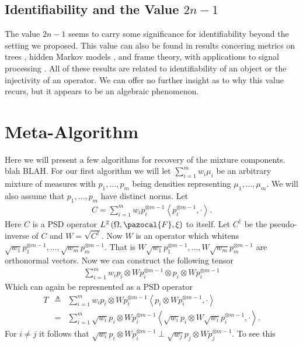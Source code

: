 \documentclass[aos]{imsart}
\def\l{\left}
\def\r{\right}
\def\sF{\pazocal{F}}
\theoremstyle{plain}
\theoremstyle{defintion}
\begin{document}
	\subsection{Identifiability and the Value $2n-1$}
	The value $2n-1$ seems to carry some significance for identifiability beyond the setting we proposed. This value can also be found in results concering metrics on trees \cite{pachter04}, hidden Markov models \cite{paz71}, and frame theory, with applications to signal processing \cite{balan06}. All of these results are related to identifiability of an object or the injectivity of an operator. We can offer no further insight as to why this value recurs, but it appears to be an algebraic phenomenon.

\section{Meta-Algorithm}
Here we will present a few algorithms for recovery of the mixture components. blah BLAH. For our first algorithm we will let $\sum_{i=1}^m w_i \mu_i$ be an arbitrary mixture of measures with $p_1,\ldots,p_m$ being densities representing $\mu_1,\ldots,\mu_m$. We will also assume that $p_1,\ldots,p_m$ have distinct norms. Let
\begin{eqnarray*}
	C = \sum_{i=1}^m w_i p_i^{\otimes m-1} \l<p_i^{\otimes m-1} ,\cdot\r>.
\end{eqnarray*}
Here $C$ is a PSD operator $L^2\left( \Omega,\sF,\xi \right)$ to itself. Let $C^\dagger$ be the pseudo-inverse of $C$ and $W = \sqrt{C^\dagger}$. Now $W$ is an operator which whitens $\sqrt{w_1} p_1^{\otimes m-1},\ldots, \sqrt{w_m}p_m^{\otimes m-1}$. That is $W \sqrt{w_1} p_1^{\otimes m-1},\ldots,W \sqrt{w_m}p_m^{\otimes m-1}$ are orthonormal vectors. Now we can construct the following tensor
	\begin{eqnarray*}
		\sum_{i=1}^m w_i p_i\otimes W p_i^{\otimes m-1} \otimes p_i\otimes W p_i^{\otimes m-1}
	\end{eqnarray*}
Which can again be represnented as a PSD operator
 	\begin{eqnarray*}
		T &\triangleq& \sum_{i=1}^m w_i p_i\otimes W p_i^{\otimes m-1} \l< p_i\otimes W p_i^{\otimes m-1},\cdot\r> \\
		&=& \sum_{i=1}^m \sqrt{w_i} p_i\otimes W p_i^{\otimes m-1} \l< \sqrt{w_i}p_i\otimes W \sqrt{w_i} p_i^{\otimes m-1},\cdot\r>.
	\end{eqnarray*}
	For $i\neq j$ it follows that $\sqrt{w_i} p_i\otimes W p_i^{\otimes m-1} \perp \sqrt{w_j} p_j\otimes W p_j^{\otimes m-1}$. To see this 
\end{document}
